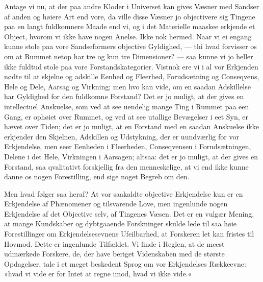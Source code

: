 \documentclass[12pt]{book}
\newcommand{\apage}[1]{\marginnote{\footnotesize\textit{[#1]}}}
\begin{document}
Antage vi nu, at der paa andre Kloder i Universet kan gives Væsner med
Sandser af anden og høiere Art end vore, da ville disse Væsner jo
objectivere sig Tingene paa en langt fuldkomnere Maade end vi, og i det
Materielle maaskee erkjende et Object, hvorom vi ikke have nogen Anelse.
Ikke nok hermed. Naar vi ei engang kunne stole paa vore Sandseformers
objective Gyldighed, --- thi hvad forvisser os om at Rummet netop har tre
og kun tre Dimensioner? --- saa kunne vi jo heller ikke fuldtud stole paa
vore Forstandskategorier. Vistnok ere vi i al vor Erkjenden nødte til at
skjelne og adskille Eenhed og Fleerhed, Forudsætning og Conseqvens, Hele
og Dele, Aarsag og Virkning; men hvo kan vide, om en saadan Adskillelse
har Gyldighed for den fuldkomne Forstand? Det er jo muligt, at der gives en
intellectuel Anskuelse, som ved at see uendelig mange Ting i Rummet paa
een Gang, er ophøiet over Rummet, og ved at see utallige Bevægelser i eet
Syn, er hævet over Tiden; det er jo muligt, at en Forstand med en saadan
Anskuelse ikke erkjender den Skjelnen, Adskillen og Udstykning, der er
uundværlig for vor Erkjendelse, men seer Eenheden i Fleerheden,
Conseqvensen i Forudsætningen, Delene i det Hele, Virkningen i Aarsagen;
altsaa: det er jo muligt, at der gives en Forstand, saa qvalitativt  \apage{53}
forskjellig fra den menneskelige, at vi end ikke kunne danne os nogen
Forestilling, end sige noget Begreb om den.

Men hvad følger saa heraf? At vor saakaldte objective Erkjendelse kun er en
Erkjendelse af Phænomener og tilsvarende Love, men ingenlunde nogen
Erkjendelse af det Objective selv, af Tingenes Væsen. Det er en vulgær
Mening, at mange Kundskaber og dybtgaaende Forskninger skulde lede til saa
høie Forestillinger om Erkjendelsesevnens Ufeilbarhed, at Forskeren let
kan fristes til Hovmod. Dette er ingenlunde Tilfældet. Vi finde i Reglen,
at de meest udmærkede Forskere, de, der have beriget Videnskaben med de
største Opdagelser, tale i et meget beskedent Sprog om vor Erkjendelses
Rækkeevne: »hvad vi vide er for Intet at regne imod, hvad vi ikke vide.«
\end{document}
